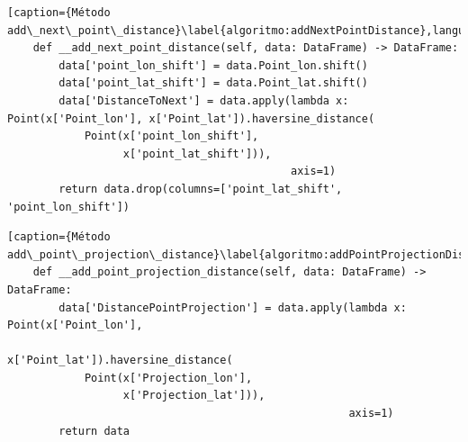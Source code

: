 \begin{lstlisting}[caption={Método add\_next\_point\_distance}\label{algoritmo:addNextPointDistance},language=Python] 
    def __add_next_point_distance(self, data: DataFrame) -> DataFrame:
        data['point_lon_shift'] = data.Point_lon.shift()
        data['point_lat_shift'] = data.Point_lat.shift()
        data['DistanceToNext'] = data.apply(lambda x: Point(x['Point_lon'], x['Point_lat']).haversine_distance(
            Point(x['point_lon_shift'],
                  x['point_lat_shift'])),
                                            axis=1)
        return data.drop(columns=['point_lat_shift', 'point_lon_shift'])
\end{lstlisting}


\begin{lstlisting}[caption={Método add\_point\_projection\_distance}\label{algoritmo:addPointProjectionDistance},language=Python] 
    def __add_point_projection_distance(self, data: DataFrame) -> DataFrame:
        data['DistancePointProjection'] = data.apply(lambda x: Point(x['Point_lon'],
                                                                     x['Point_lat']).haversine_distance(
            Point(x['Projection_lon'],
                  x['Projection_lat'])),
                                                     axis=1)
        return data
\end{lstlisting}

